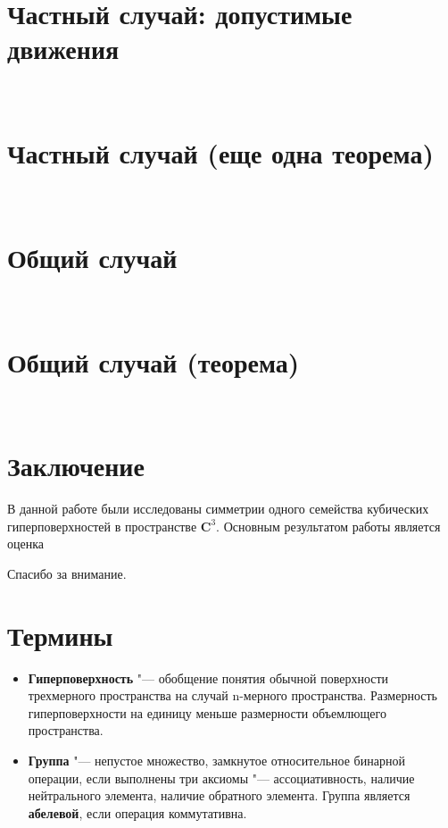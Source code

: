 \documentclass[a4paper,14pt]{extarticle}
\begin{document}
\section{Частный случай: допустимые движения}
~

\section{Частный случай (еще одна теорема)}
~

\section{Общий случай}
~

\section{Общий случай (теорема)}
~

\section{Заключение}
В данной работе были исследованы симметрии одного семейства кубических гиперповерхностей в пространстве $\mathbf{C}^3$. Основным результатом работы является оценка 

Спасибо за внимание.

\clearpage
{}{}
\appendix
\section{Термины}
\begin{itemize}
\item \textbf{Гиперповерхность} "--- обобщение понятия обычной поверхности трехмерного пространства на случай n-мерного пространства. Размерность гиперповерхности на единицу меньше размерности объемлющего пространства.

\item \textbf{Группа} "--- непустое множество, замкнутое относительное бинарной операции, если выполнены три аксиомы "--- ассоциативность, наличие нейтрального элемента, наличие обратного элемента. Группа является \textbf{абелевой}, если операция коммутативна.
\end{itemize}
\end{document}
